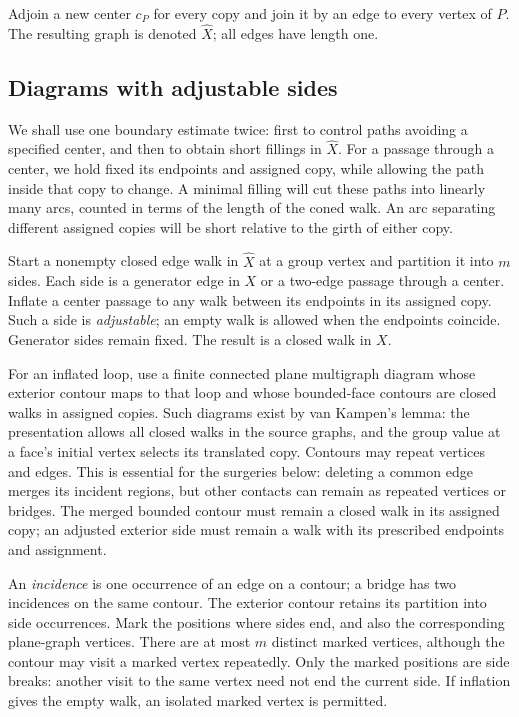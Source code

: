 Adjoin a new center \(c_P\) for every copy and join it by an edge to every
vertex of \(P\). The resulting graph is denoted \(\widehat X\); all edges
have length one.

\subsection{Diagrams with adjustable sides}

We shall use one boundary estimate twice: first to control paths avoiding
a specified center, and then to obtain short fillings in \(\widehat X\).
For a passage through a center, we hold fixed its endpoints and assigned
copy, while allowing the path inside that copy to change. A minimal
filling will cut these paths into linearly many arcs, counted in terms
of the length of the coned walk. An arc separating different assigned
copies will be short relative to the girth of either copy.

Start a nonempty closed edge walk in \(\widehat X\) at a group vertex
and partition it into \(m\) sides. Each side is a generator edge in
\(X\) or a two-edge passage through a center. Inflate a center passage
to any walk between its endpoints in its assigned copy. Such a side is
\emph{adjustable}; an empty walk is allowed when the endpoints coincide.
Generator sides remain fixed. The result is a closed walk in \(X\).

For an inflated loop, use a finite connected plane multigraph diagram
whose exterior contour maps to that loop and whose bounded-face contours
are closed walks in assigned copies. Such diagrams exist by van Kampen's
lemma: the presentation allows all closed walks in the source graphs,
and the group value at a face's initial vertex selects its translated
copy. Contours may repeat vertices and edges. This is essential for the
surgeries below: deleting a common edge merges its incident regions,
but other contacts can remain as repeated vertices or bridges. The
merged bounded contour must remain a closed walk in its assigned copy;
an adjusted exterior side must remain a walk with its prescribed
endpoints and assignment.

An \emph{incidence} is one occurrence of an edge on a contour; a bridge
has two incidences on the same contour. The exterior contour retains its
partition into side occurrences. Mark the positions where sides end,
and also the corresponding plane-graph vertices. There are at most
\(m\) distinct marked vertices, although the contour may visit a marked
vertex repeatedly. Only the marked positions are side breaks: another
visit to the same vertex need not end the current side. If inflation
gives the empty walk, an isolated marked vertex is permitted.

